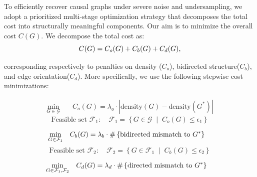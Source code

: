 To efficiently recover causal graphs under severe noise and undersampling, we adopt a prioritized multi-stage optimization strategy that decomposes the total cost into structurally meaningful components. Our aim is to minimize the overall cost $C(G)$. We decompose the total cost as:
\vspace{-3pt}
\begin{equation}
\label{eq:overall}
C(G) = C_o(G) + C_b(G) + C_d(G),
\vspace{-0.3cm}
\end{equation}



corresponding respectively to penalties on density ($C_o$), bidirected structure($C_b$), and edge orientation($C_d$). More specifically, we use the following stepwise cost minimizations:
\vspace{-15pt}


\begin{align}
\min_{G \in \mathcal{G}} \quad & C_o(G) = \lambda_o \cdot \left| \text{density}(G) - \text{density}(G^*) \right|
\end{align}
\vspace{-13pt}
\begin{equation*}
\text{Feasible set } \mathcal{F}_1:\quad 
\mathcal{F}_1 = \left\{ G \in \mathcal{G} \;\middle|\; C_o(G) \leq \epsilon_1 \right\}
\end{equation*}

\vspace{-0.3cm}
\begin{align}
\vspace{-18pt}
\min_{G \in \mathcal{F}_1} \quad & C_b(G) = \lambda_b \cdot \#\left\{\text{bidirected mismatch to } G^*\right\}
\end{align}
\vspace{-18pt}
\begin{equation*}
\text{Feasible set } \mathcal{F}_2:\quad
\mathcal{F}_2 = \left\{ G \in \mathcal{F}_1 \;\middle|\; C_b(G) \leq \epsilon_2 \right\}
\end{equation*}

\vspace{-12pt}
\begin{align}
\min_{G \in \mathcal{F}_1 ,\mathcal{F}_2} \quad & C_d(G) = \lambda_d \cdot \#\left\{\text{directed mismatch to } G^*\right\}
\vspace{-0.3cm}
\end{align}

